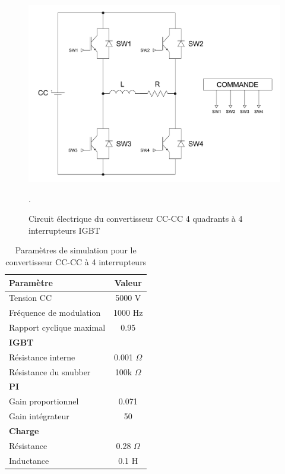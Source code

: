 \begin{figure}[htb]
\centering
\includegraphics[scale=0.5]{fig/H4Q.png}
\caption{Circuit électrique du convertisseur CC-CC 4 quadrants à 4 interrupteurs IGBT}.
\end{figure}

\begin{table}[htb]
\centering
\begin{tabular}{|l|c|} 
  \hline
  \textbf{Paramètre} & \textbf{Valeur}  \\
  \hline\hline
  Tension CC & 5000 V\\ \hline
  Fréquence de modulation & 1000 Hz\\ \hline
  Rapport cyclique maximal & 0.95 \\ \hline \hline
  \multicolumn{2}{|l|}{\textbf{IGBT}}\\ \hline
  Résistance interne & 0.001 $\Omega$\\
  Résistance du snubber & 100k $\Omega$\\ \hline \hline
   \multicolumn{2}{|l|}{\textbf{PI}}\\ \hline
  Gain proportionnel & 0.071 \\
  Gain intégrateur & 50 \\ \hline \hline
  \multicolumn{2}{|l|}{\textbf{Charge}}\\ \hline
  Résistance & 0.28 $\Omega$\\
  Inductance & 0.1 H\\
  \hline
\end{tabular}
\caption{Paramètres de simulation pour le convertisseur CC-CC à 4 interrupteurs}
\label{p_hash}
\end{table}

